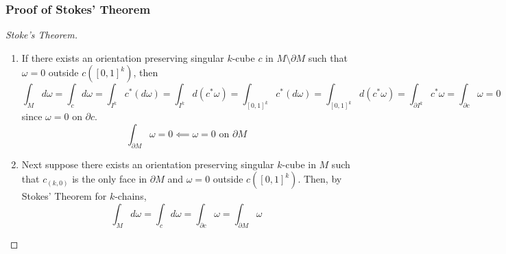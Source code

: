 \documentclass{article}
\begin{document}
\subsubsection{Proof of Stokes' Theorem}

\begin{proof}[Stoke's Theorem]

\begin{enumerate}

  \item If there exists an orientation preserving singular \(k\)-cube \(c\) in \(M \setminus \partial M\) such that \(\omega = 0\) outside \(c([0, 1]^k)\), then
  \begin{equation}
    \int_Md\omega = \int_c d\omega = \int_{I^k}c^*(d\omega) = \int_{I^k}d(c^*\omega) = \int_{[0, 1]^k}c^*(d\omega) = \int_{[0, 1]^k}d(c^*\omega) = \int_{\partial I^k}c^*\omega = \int_{\partial c}\omega = 0
  \end{equation}
  since \(\omega = 0\) on \(\partial c\).
  \begin{equation}
    \int_{\partial M}\omega = 0 \impliedby \omega = 0 \text{ on } \partial M
  \end{equation} \label{proof:stokes_1}

  \item Next suppose there exists an orientation preserving singular \(k\)-cube in \(M\) such that \(c_{(k, 0)}\) is the only face in \(\partial M\) and \(\omega = 0\) outside \(c([0, 1]^k)\).
  Then, by Stokes' Theorem for \(k\)-chains,
  \begin{equation}
    \int_Md\omega = \int_cd\omega = \int_{\partial c}\omega = \int_{\partial M}\omega
  \end{equation} \label{proof:stokes_2}


\end{enumerate}
\end{proof}
\end{document}
